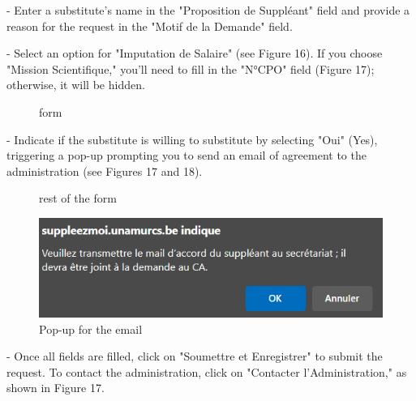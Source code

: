 \documentclass[12pt]{article}
\begin{document}
- Enter a substitute's name in the "Proposition de Suppléant" field and provide a reason for the request in the "Motif de la Demande" field.

- Select an option for "Imputation de Salaire" (see Figure 16). If you choose "Mission Scientifique," you'll need to fill in the "N°CPO" field (Figure 17); otherwise, it will be hidden.
\begin{figure}[H]
    \centering
    \caption{form}
\end{figure}


- Indicate if the substitute is willing to substitute by selecting "Oui" (Yes), triggering a pop-up prompting you to send an email of agreement to the administration (see Figures 17 and 18).
\begin{figure}[H]
    \centering
    \caption{rest of the form}
\end{figure}

\begin{figure}[H]
    \centering
    \includegraphics[width=0.75\linewidth]{image18.png}
    \caption{Pop-up for the email}
\end{figure}
- Once all fields are filled, click on "Soumettre et Enregistrer" to submit the request. To contact the administration, click on "Contacter l'Administration," as shown in Figure 17.
\end{document}
